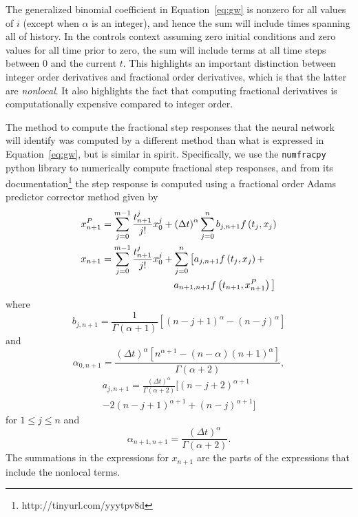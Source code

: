   The generalized binomial coefficient in Equation~\ref{eq:gw} is nonzero for
  all values of $i$ (except when $\alpha$ is an integer), and hence the sum
  will include times spanning all of history. In the controls context assuming
  zero initial conditions and zero values for all time prior to zero, the sum
  will include terms at all time steps between $0$ and the current $t$. This
  highlights an important distinction between integer order derivatives and
  fractional order derivatives, which is that the latter are \emph{nonlocal}.
  It also highlights the fact that computing fractional derivatives is
  computationally expensive compared to integer order. 

  The method to compute the fractional step responses that the neural network
  will identify was computed by a different method than what is expressed in
  Equation~\ref{eq:gw}, but is similar in spirit. Specifically, we use the
  \texttt{numfracpy} python library to numerically compute fractional step
  responses, and from its documentation\footnote{http://tinyurl.com/yyytpv8d} the step response is computed using a
  fractional order Adams predictor corrector method given by
  \begin{align*}
  x^P_{n+1} &= \sum_{j=0}^{m-1} \frac{t^j_{n+1}}{j!}x_0^j + \left( \Delta t
  \right)^\alpha \sum_{j=0}^n b_{j,n+1} f\left( t_j, x_j \right) \\
  x_{n+1} &=  \sum_{j=0}^{m-1} \frac{t^j_{n+1}}{j!}x_0^j + \sum_{j=0}^n \big[ a_{j,n+1}
  f \left( t_j, x_j \right) + \\ &\  \hspace*{1in} a_{n+1,n+1} f\left( t_{n+1},
x^P_{n+1} \right) \big]
  \end{align*}
  where
  \[
  b_{j,n+1} = \frac{1}{\Gamma (\alpha + 1 )} \left[(n-j+1)^\alpha -
  (n-j)^\alpha \right]
  \] and
  \[\alpha_{0,n+1} = \frac{\left(\Delta t \right)^\alpha \left[n^{\alpha + 1} -
  (n-\alpha)(n+1)^\alpha\right]}{\Gamma \left( \alpha + 2 \right)},
  \]
  \begin{multline*}
  a_{j,n+1} = \frac{\left( \Delta t \right)^\alpha}{\Gamma \left( \alpha + 2
  \right)} \big[ (n-j+2)^{\alpha + 1} \\
  -2 (n - j + 1)^{\alpha + 1} + (n-j)^{\alpha + 1} \big]
  \end{multline*} for $1 \leq j \leq n$
  and
  \[
  \alpha_{n+1,n+1} = \frac{\left( \Delta t \right)^\alpha}{\Gamma\left(\alpha +
  2\right)}.
  \]
  The summations in the expressions for $x_{n+1}$ are the parts of the
  expressions that include the nonlocal terms.
